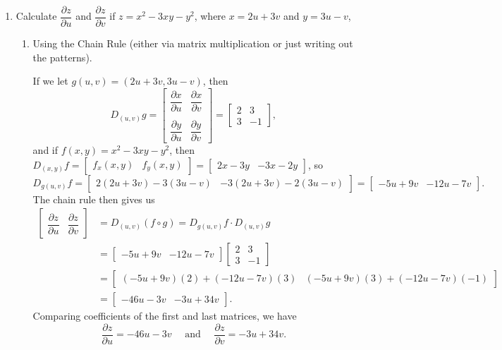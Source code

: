 \documentclass[letterpaper,12pt]{article}
\newcommand{\pd}[2]{\dfrac{\partial #1}{\partial #2}}
\begin{document}
\begin{enumerate}
 \item Calculate $\pd{z}{u}$ and $\pd{z}{v}$ if $z=x^2-3xy-y^2$, where $x=2u+3v$ and $y=3u-v$,
\begin{enumerate}
 \item Using the Chain Rule (either via matrix multiplication or just writing out the patterns).

\bigskip

If we let $g(u,v) = (2u+3v, 3u-v)$, then
\[
 D_{(u,v)}g = \begin{bmatrix} \pd{x}{u}&\pd{x}{v}\\& \\ \pd{y}{u}&\pd{y}{v}\end{bmatrix} = \begin{bmatrix} 2&3\\3&-1\end{bmatrix},
\]
and if $f(x,y) = x^2-3xy-y^2$, then $D_{(x,y)}f = \begin{bmatrix}f_x(x,y) & f_y(x,y)\end{bmatrix} = \begin{bmatrix} 2x-3y & -3x-2y\end{bmatrix}$, so
\[
 D_{g(u,v)}f = \begin{bmatrix}2(2u+3v)-3(3u-v)&-3(2u+3v)-2(3u-v)\end{bmatrix} = \begin{bmatrix}-5u+9v&-12u-7v\end{bmatrix}.
\]
The chain rule then gives us
\begin{align*}
 \begin{bmatrix}\pd{z}{u}&\pd{z}{v}\end{bmatrix} &= D_{(u,v)}(f\circ g) = D_{g(u,v)}f\cdot D_{(u,v)}g\\
& = \begin{bmatrix}-5u+9v&-12u-7v\end{bmatrix}\begin{bmatrix}2&3\\3&-1\end{bmatrix}\\
& = \begin{bmatrix}(-5u+9v)(2)+(-12u-7v)(3)&(-5u+9v)(3)+(-12u-7v)(-1)\end{bmatrix}\\
& = \begin{bmatrix}-46u-3v&-3u+34v\end{bmatrix}.
\end{align*}
Comparing coefficients of the first and last matrices, we have
\[
 \pd{z}{u} = -46u-3v \quad \text{ and } \quad \pd{z}{v} = -3u+34v.
\]



\end{enumerate}
\end{enumerate}
\end{document}

